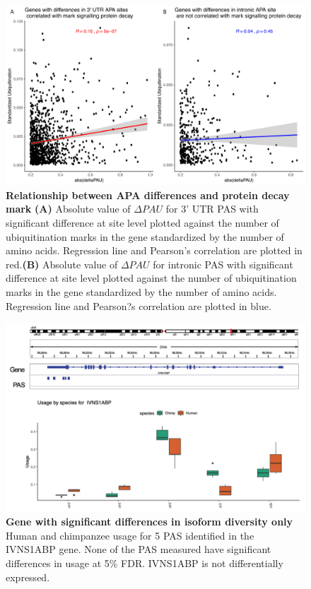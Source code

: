 \begin{figure}[!htb]
\centering
\includegraphics[width=5in]{img/ch03/Fig3-figSup2.pdf}
\caption[Relationship between APA differences and protein decay mark]{\textbf{Relationship between APA differences and protein decay mark} {\bf (A)} Absolute value of $\Delta PAU$ for 3' UTR PAS with significant difference at site level plotted against the number of ubiquitination marks in the gene standardized by the number of amino acids. Regression line and Pearson's correlation are plotted in red.{\bf (B)} Absolute value of $\Delta PAU$ for intronic PAS with significant difference at site level plotted against the number of ubiquitination marks in the gene standardized by the number of amino acids. Regression line and Pearson?s correlation are plotted in blue.}
\label{fig:ch03-ubiq}
\end{figure}
\clearpage

\begin{figure}[!htb]
\centering
\includegraphics[width=5in]{img/ch03/Fig4_figSup1.pdf}
\caption[Gene with significant differences in isoform diversity only]{\textbf{Gene with significant differences in isoform diversity only} Human and chimpanzee usage for 5 PAS identified in the IVNS1ABP gene. None of the PAS measured have significant differences in usage at 5\% FDR. IVNS1ABP is not differentially expressed.}
\label{fig:ch03-ivn}
\end{figure}
\clearpage

